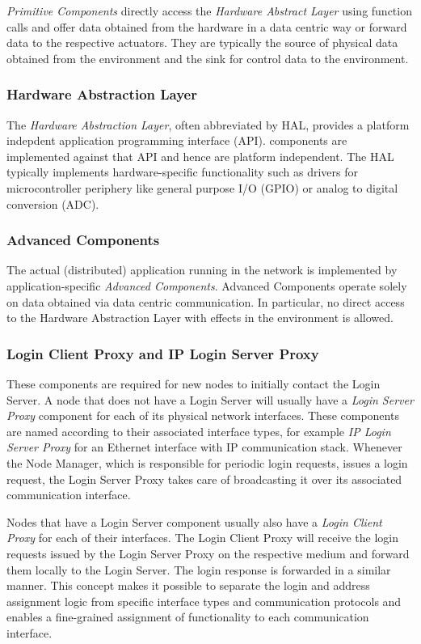 \emph{Primitive Components} directly access the \emph{Hardware Abstract Layer} using function calls
and offer data obtained from the hardware in a data centric way or forward data to the respective actuators.
They are typically the source of physical data obtained from the environment and
the sink for control data to the environment.

\subsubsection{Hardware Abstraction Layer}

The \emph{Hardware Abstraction Layer}, often abbreviated by HAL,
provides a platform indepdent application programming interface (API).
\xme components are implemented against that API and hence are platform independent.
The HAL typically implements hardware-specific functionality such as drivers for microcontroller periphery
like general purpose I/O (GPIO) or analog to digital conversion (ADC).

\subsubsection{Advanced Components}

The actual (distributed) application running in the network is implemented by application-specific \emph{Advanced Components}.
Advanced Components operate solely on data obtained via data centric communication.
In particular, no direct access to the Hardware Abstraction Layer with effects in the environment is allowed.

\subsubsection{Login Client Proxy and IP Login Server Proxy}

These components are required for new nodes to initially contact the Login Server.
A node that does not have a Login Server will usually have a \emph{Login Server Proxy} component for each of its physical network interfaces.
These components are named according to their associated interface types,
for example \emph{IP Login Server Proxy} for an Ethernet interface with IP communication stack.
Whenever the Node Manager, which is responsible for periodic login requests, issues a login request,
the Login Server Proxy takes care of broadcasting it over its associated communication interface.

Nodes that have a Login Server component usually also have a \emph{Login Client Proxy} for each of their interfaces.
The Login Client Proxy will receive the login requests issued by the Login Server Proxy on the respective medium
and forward them locally to the Login Server.
The login response is forwarded in a similar manner.
%
This concept makes it possible to separate the login and address assignment logic from specific interface types and communication protocols
and enables a fine-grained assignment of functionality to each communication interface.

